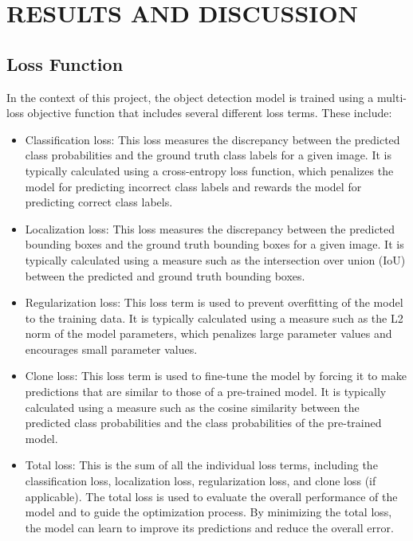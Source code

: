 \graphicspath{{Figures/chapter4}}
\chapter{RESULTS AND DISCUSSION}
\section{Loss Function}
In the context of this project, the object detection model is trained using a multi-loss objective function that includes several different loss terms. These include:
\begin{itemize}
\item Classification loss: This loss measures the discrepancy between the predicted class probabilities and the ground truth class labels for a given image. It is typically calculated using a cross-entropy loss function, which penalizes the model for predicting incorrect class labels and rewards the model for predicting correct class labels.

\item Localization loss: This loss measures the discrepancy between the predicted bounding boxes and the ground truth bounding boxes for a given image. It is typically calculated using a measure such as the intersection over union (IoU) between the predicted and ground truth bounding boxes.

\item Regularization loss: This loss term is used to prevent overfitting of the model to the training data. It is typically calculated using a measure such as the L2 norm of the model parameters, which penalizes large parameter values and encourages small parameter values.

\item Clone loss: This loss term is used to fine-tune the model by forcing it to make predictions that are similar to those of a pre-trained model. It is typically calculated using a measure such as the cosine similarity between the predicted class probabilities and the class probabilities of the pre-trained model.

\item Total loss: This is the sum of all the individual loss terms, including the classification loss, localization loss, regularization loss, and clone loss (if applicable). The total loss is used to evaluate the overall performance of the model and to guide the optimization process. By minimizing the total loss, the model can learn to improve its predictions and reduce the overall error.
\end{itemize}
